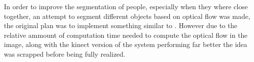 In order to improve the segmentation of people, especially when they where close together, an attempt to segment different objects based on optical flow was made,
the original plan was to implement something similar to \Cite{flowpaper}. However due to the relative ammount of computation time needed to compute the optical flow in the image, 
along with the kinect version of the system performing far better the idea was scrapped before being fully realized.
